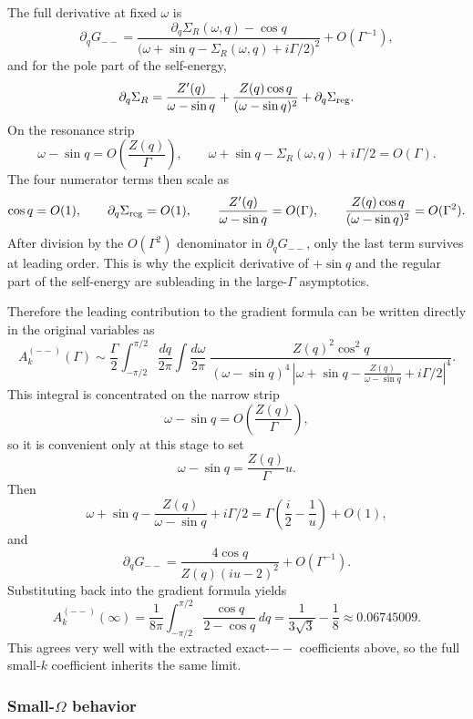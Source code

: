 \documentclass[aps,prx,preprint,amsmath,amssymb]{revtex4-2}
\begin{document}
The full derivative at fixed \(\omega\) is
\[
\partial_q G_{--}
=
\frac{\partial_q\Sigma_R(\omega,q)-\cos q}
{\bigl(\omega+\sin q-\Sigma_R(\omega,q)+i\Gamma/2\bigr)^2}
+O(\Gamma^{-1}),
\]
and for the pole part of the self-energy,
\[
\partial_q\Sigma_R
=
\frac{Z'(q)}{\omega-\sin q}
+
\frac{Z(q)\cos q}{(\omega-\sin q)^2}
+
\partial_q\Sigma_{\rm reg}.
\]
On the resonance strip
\[
\omega-\sin q = O\!\left(\frac{Z(q)}{\Gamma}\right),
\qquad
\omega+\sin q-\Sigma_R(\omega,q)+i\Gamma/2 = O(\Gamma).
\]
The four numerator terms then scale as
\[
\cos q=O(1),\qquad
\partial_q\Sigma_{\rm reg}=O(1),\qquad
\frac{Z'(q)}{\omega-\sin q}=O(\Gamma),\qquad
\frac{Z(q)\cos q}{(\omega-\sin q)^2}=O(\Gamma^2).
\]
After division by the \(O(\Gamma^2)\) denominator in \(\partial_q G_{--}\),
only the last term survives at leading order.  This is why the explicit
derivative of \(+\sin q\) and the regular part of the self-energy are
subleading in the large-\(\Gamma\) asymptotics.

Therefore the leading contribution to the gradient formula can be written
directly in the original variables as
\begin{equation}
\label{eq:Ak-omegaq-app-detailed}
A_k^{(--)}(\Gamma)
\sim
\frac{\Gamma}{2}
\int_{-\pi/2}^{\pi/2}\frac{dq}{2\pi}
\int\frac{d\omega}{2\pi}\;
\frac{Z(q)^2\cos^2 q}
{(\omega-\sin q)^4\,
\left|\omega+\sin q-\frac{Z(q)}{\omega-\sin q}+i\Gamma/2\right|^4}.
\end{equation}
This integral is concentrated on the narrow strip
\[
\omega-\sin q = O\!\left(\frac{Z(q)}{\Gamma}\right),
\]
so it is convenient only at this stage to set
\[
\omega-\sin q=\frac{Z(q)}{\Gamma}u.
\]
Then
\[
\omega+\sin q-\frac{Z(q)}{\omega-\sin q}+i\Gamma/2
=
\Gamma\left(\frac{i}{2}-\frac{1}{u}\right)+O(1),
\]
and
\[
\partial_q G_{--}
=
\frac{4\cos q}{Z(q)(iu-2)^2}+O(\Gamma^{-1}).
\]
Substituting back into the gradient formula yields
\begin{equation}\label{eq:Ak-final-app}
A_k^{(--)}(\infty)
=
\frac{1}{8\pi}\int_{-\pi/2}^{\pi/2}\frac{\cos q}{2-\cos q}\,dq
=
\frac{1}{3\sqrt{3}}-\frac{1}{8}
\approx 0.06745009.
\end{equation}
This agrees very well with the extracted exact-\(--\) coefficients above, so the
full small-\(k\) coefficient inherits the same limit.

\subsubsection{Small-\texorpdfstring{$\Omega$}{Omega} behavior}
\end{document}
